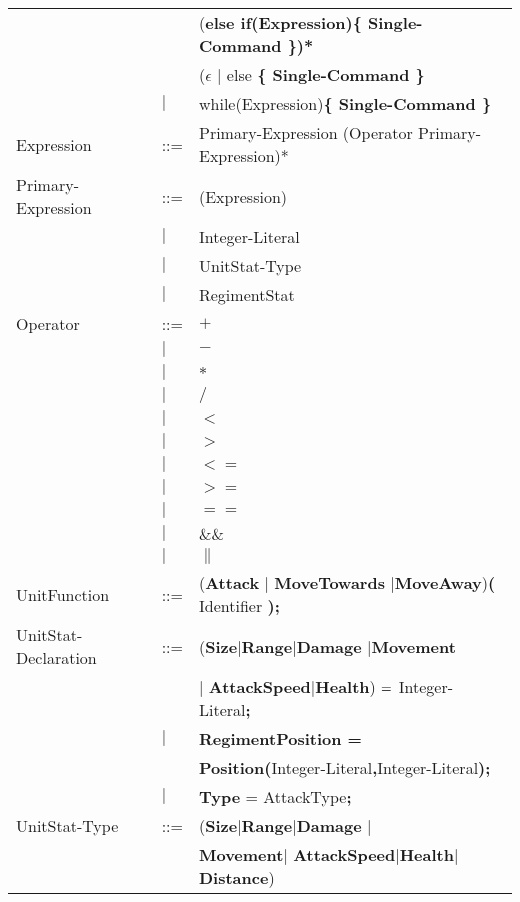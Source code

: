 \begin{center}
\begin{longtable}{ l l l }
									&		&(\bf{else if(}Expression\bf{)\{ }Single-Command\bf{ \}})* \\
									&		&($\epsilon$ $\mid$ else \bf{\{ }Single-Command \bf{\} }\\					   
									&$\mid$	&while(Expression)\bf{\{ } Single-Command \bf{\}}\\
		Expression					&	::=	&Primary-Expression (Operator Primary-Expression)*\\
		Primary-Expression			&	::=	&(Expression)\\
									&$\mid$	&Integer-Literal \\
									&$\mid$	&UnitStat-Type\\
									&$\mid$	&RegimentStat \\	
		Operator					&	::=	&$\boldsymbol {+}$\\
									&$\mid$	&$\boldsymbol {-}$\\
									&$\mid$	&$\boldsymbol {*}$\\
									&$\mid$	&$\boldsymbol {/}$\\
									&$\mid$	&$\boldsymbol {<}$\\
									&$\mid$	&$\boldsymbol {>}$\\
									&$\mid$	&$\boldsymbol {<=}$\\
									&$\mid$	&$\boldsymbol {>=}$\\
									&$\mid$	&$\boldsymbol {==}$\\
									&$\mid$	&$\boldsymbol {\&\&}$\\
									&$\mid$	&$\boldsymbol {\|}$\\
		UnitFunction				&	::=	&({\bf Attack} $\mid$ {\bf MoveTowards} $\mid${\bf MoveAway}){\bf (} Identifier {\bf );}\\
		UnitStat-Declaration		&	::=	&({\bf Size}$\mid${\bf Range}$\mid${\bf Damage} $\mid${\bf Movement}\\ 
									&		&$\mid$ {\bf AttackSpeed}$\mid${\bf Health}) ${\bf = }$ Integer-Literal{\bf ;} \\
									&$\mid$	&{\bf RegimentPosition =} \\
									&		&{\bf Position(}Integer-Literal{\bf ,}Integer-Literal{\bf );}\\
									&$\mid$	&{\bf Type} = AttackType{\bf ;}\\
		UnitStat-Type				&	::=	&({\bf Size}$\mid${\bf Range}$\mid${\bf Damage} $\mid$\\
									&		&{\bf Movement}$\mid$ {\bf AttackSpeed}$\mid${\bf Health}$\mid${\bf Distance})\\ 

\end{longtable}
\end{center}
